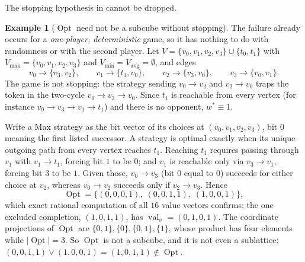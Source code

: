 \documentclass[11pt]{article}
\theoremstyle{plain}
\theoremstyle{definition}
\newtheorem{example}[theorem]{Example}
\DeclareMathOperator{\val}{val}
\DeclareMathOperator{\Opt}{Opt}
\newcommand{\Vmax}{V_{\max}}
\newcommand{\Vmin}{V_{\min}}
\newcommand{\Vavg}{V_{\mathrm{avg}}}
\begin{document}
The stopping hypothesis in  cannot be dropped.

\begin{example}[$\Opt$ need not be a subcube without stopping]\label{ex:nonstopping-nonsubcube}
The failure already occurs for a \emph{one-player, deterministic} game,
so it has nothing to do with randomness or with the second player. Let
$V=\{v_0,v_1,v_2,v_3\}\cup\{t_0,t_1\}$ with
$\Vmax=\{v_0,v_1,v_2,v_3\}$ and $\Vmin=\Vavg=\emptyset$, and edges
\[
  v_0\to\{v_3,v_2\},\qquad
  v_1\to\{t_1,v_0\},\qquad
  v_2\to\{v_3,v_0\},\qquad
  v_3\to\{v_0,v_1\}.
\]
The game is not stopping: the strategy sending $v_0\to v_2$ and
$v_2\to v_0$ traps the token in the two-cycle $v_0\to v_2\to v_0$. Since
$t_1$ is reachable from every vertex (for instance
$v_0\to v_3\to v_1\to t_1$) and there is no opponent, $w^\ast\equiv1$.

Write a Max strategy as the bit vector of its choices at
$(v_0,v_1,v_2,v_3)$, bit $0$ meaning the first listed successor. A
strategy is optimal exactly when its unique outgoing path from every
vertex reaches $t_1$. Reaching $t_1$ requires passing through $v_1$ with
$v_1\to t_1$, forcing bit $1$ to be $0$; and $v_1$ is reachable only via
$v_3\to v_1$, forcing bit $3$ to be $1$. Given those, $v_0\to v_3$ (bit
$0$ equal to $0$) succeeds for either choice at $v_2$, whereas
$v_0\to v_2$ succeeds only if $v_2\to v_3$. Hence
\[
  \Opt=\bigl\{(0,0,0,1),\;(0,0,1,1),\;(1,0,0,1)\bigr\},
\]
which exact rational computation of all $16$ value vectors confirms; the
one excluded completion, $(1,0,1,1)$, has
$\val_\sigma=(0,1,0,1)$. The coordinate projections of $\Opt$ are
$\{0,1\},\{0\},\{0,1\},\{1\}$, whose product has four elements while
$|\Opt|=3$. So $\Opt$ is not a subcube, and it is not even a sublattice:
$(0,0,1,1)\vee(1,0,0,1)=(1,0,1,1)\notin\Opt$.
\end{example}
\end{document}
